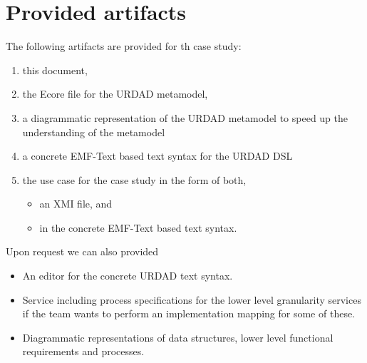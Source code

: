 \section{Provided artifacts}

The following artifacts are provided for th case study:
\begin{enumerate}
  \item this document,
  \item the Ecore file for the URDAD metamodel,
  \item a diagrammatic representation of the URDAD metamodel to speed up the understanding of the metamodel
  \item a concrete EMF-Text based text syntax for the URDAD DSL
  \item the use case for the case study in the form of both, 
    \begin{itemize}
     \item an XMI file, and
     \item in the concrete EMF-Text based text syntax.
    \end{itemize}
\end{enumerate}

Upon request we can also provided
\begin{itemize}
  \item An editor for the concrete URDAD text syntax.
  \item Service including process specifications for the lower level granularity services if the team wants to perform an implementation mapping for some of these.
  \item Diagrammatic representations of data structures, lower level functional requirements and processes.
\end{itemize}

